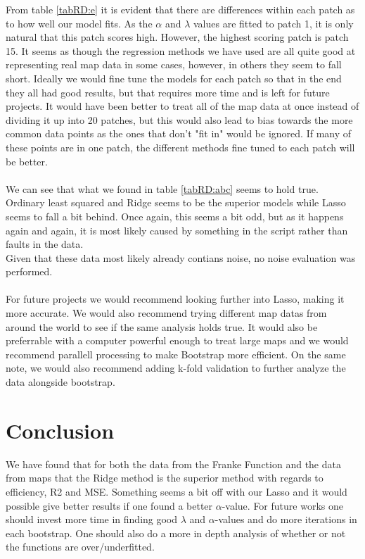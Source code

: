 \documentclass[12pt]{article}
\begin{document}
From table \ref{tabRD:e} it is evident that there are differences within each patch as to how well our model fits. As the $\alpha$ and $\lambda$ values are fitted to patch 1, it is only natural that this patch scores high. However, the highest scoring patch is patch 15. It seems as though the regression methods we have used are all quite good at representing real map data in some cases, however, in others they seem to fall short. Ideally we would fine tune the models for each patch so that in the end they all had good results, but that requires more time and is left for future projects. It would have been better to treat all of the map data at once instead of dividing it up into 20 patches, but this would also lead to bias towards the more common data points as the ones that don't "fit in" would be ignored. If many of these points are in one patch, the different methods fine tuned to each patch will be better. \\ \\
We can see that what we found in table \ref{tabRD:abc} seems to hold true. Ordinary least squared and Ridge seems to be the superior models while Lasso seems to fall a bit behind. Once again, this seems a bit odd, but as it happens again and again, it is most likely caused by something in the script rather than faults in the data. \\
Given that these data most likely already contians noise, no noise evaluation was performed. \\ \\
For future projects we would recommend looking further into Lasso, making it more accurate. We would also recommend trying different map datas from around the world to see if the same analysis holds true. It would also be preferrable with a computer powerful enough to treat large maps and we would recommend parallell processing to make Bootstrap more efficient. On the same note, we would also recommend adding k-fold validation to further analyze the data alongside bootstrap. 
\section{Conclusion}  \label{s:con}
We have found that for both the data from the Franke Function and the data from maps that the Ridge method is the superior method with regards to efficiency, R2 and MSE. Something seems a bit off with our Lasso and it would possible give better results if one found a better $\alpha$-value. For future works one should invest more time in finding good $\lambda$ and $\alpha$-values and do more iterations in each bootstrap. One should also do a more in depth analysis of whether or not the functions are over/underfitted.
\end{document}
